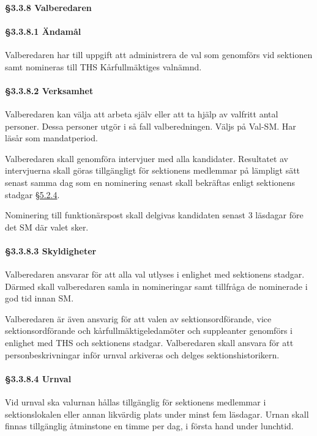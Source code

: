 \paragraph{§3.3.8 Valberedaren}

\paragraph{§3.3.8.1 Ändamål}

Valberedaren har till uppgift att administrera de val som genomförs vid sektionen samt nomineras till THS Kårfullmäktiges valnämnd.

\paragraph{§3.3.8.2 Verksamhet}

Valberedaren kan välja att arbeta själv eller att ta hjälp av valfritt antal personer. Dessa personer utgör i så fall valberedningen. Väljs på Val-SM. Har läsår som mandatperiod.

Valberedaren skall genomföra intervjuer med alla kandidater. Resultatet av intervjuerna skall göras tillgängligt för sektionens medlemmar på lämpligt sätt senast samma dag som en nominering senast skall bekräftas enligt sektionens stadgar \href{/sektionen/formalia/stadgar#funktionarer}{§5.2.4}.

Nominering till funktionärspost skall delgivas kandidaten senast 3 läsdagar före det SM där valet sker.

\paragraph{§3.3.8.3 Skyldigheter}

Valberedaren ansvarar för att alla val utlyses i enlighet med sektionens stadgar. Därmed skall valberedaren samla in nomineringar samt tillfråga de nominerade i god tid innan SM.

Valberedaren är även ansvarig för att valen av sektionsordförande, vice sektionsordförande och kårfullmäktigeledamöter och suppleanter genomförs i enlighet med THS och sektionens stadgar. Valberedaren skall ansvara för att personbeskrivningar inför urnval arkiveras och delges sektionshistorikern.

\paragraph{§3.3.8.4 Urnval}

Vid urnval ska valurnan hållas tillgänglig för sektionens medlemmar i sektionslokalen eller annan likvärdig plats under minst fem läsdagar. Urnan skall finnas tillgänglig åtminstone en timme per dag, i första hand under lunchtid.

